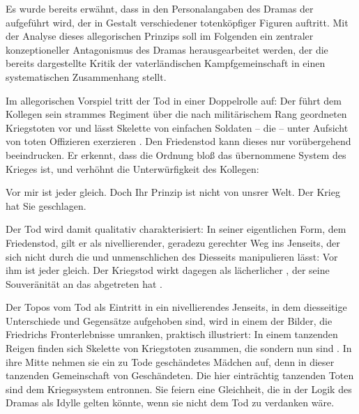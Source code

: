 Es wurde bereits erwähnt, dass in den Personalangaben des Dramas der \Cite{Tod
  als Feind des Geistes} aufgeführt wird, der in Gestalt verschiedener
totenköpfiger Figuren auftritt. Mit der Analyse dieses allegorischen
Prinzips soll im Folgenden ein zentraler konzeptioneller Antagonismus des
Dramas herausgearbeitet werden, der die bereits dargestellte Kritik der
vaterländischen Kampfgemeinschaft in einen systematischen Zusammenhang
stellt.

Im allegorischen Vorspiel \Cite{Die Totenkaserne} tritt der Tod in einer
Doppelrolle auf: Der \Cite{Kriegstod} führt dem Kollegen \Cite{Friedenstod}
sein strammes Regiment über die nach militärischem Rang geordneten Kriegstoten
vor und lässt Skelette von einfachen Soldaten -- die \Cite{schlichten Nummern} --
unter Aufsicht von toten Offizieren exerzieren .  Den
Friedenstod kann dieses
\Cite{ordnende Prinzip}  nur vorübergehend beeindrucken. Er
erkennt, dass die
Ordnung bloß das übernommene System des Krieges ist, und verhöhnt die
Unterwürfigkeit des Kollegen:

\begin{BlockQuote}
  Vor mir ist jeder gleich. Doch Ihr Prinzip ist nicht von unsrer Welt. Der
  Krieg hat Sie geschlagen.
\end{BlockQuote}
Der Tod wird damit qualitativ charakterisiert: In seiner eigentlichen Form,
dem Friedenstod, gilt er als nivellierender, geradezu gerechter Weg ins
Jenseits, der sich nicht durch die \Cite{Vorurteile} und unmenschlichen
\Cite{Ordnungen} des Diesseits manipulieren lässt: Vor ihm ist jeder
gleich. Der Kriegstod wirkt dagegen als lächerlicher \Cite{Tod von heute}, der
seine Souveränität an das \Cite{Kriegssystem} abgetreten hat
.

Der Topos vom Tod als Eintritt in ein nivellierendes Jenseits, in dem
diesseitige Unterschiede und Gegensätze aufgehoben sind, wird in einem der
\Cite{traumfernen} Bilder, die Friedrichs Fronterlebnisse umranken, praktisch
illustriert: In einem tanzenden Reigen finden sich Skelette von Kriegstoten
zusammen, die \Cite{nicht mehr Freund und Feind} sondern nun \Cite{alle
  gleich} sind . In ihre Mitte nehmen sie ein zu Tode
geschändetes Mädchen auf,
denn \Cite{aus ist's mit der Scham}  in dieser tanzenden
Gemeinschaft von Geschändeten. Die hier einträchtig tanzenden Toten sind dem
Kriegssystem
entronnen. Sie feiern eine Gleichheit, die in der Logik des Dramas als Idylle
gelten könnte, wenn sie nicht dem Tod zu verdanken wäre.

